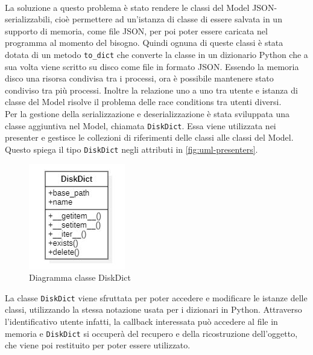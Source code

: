 \\
La soluzione a questo problema è stato rendere le classi del Model JSON-serializzabili, cioè permettere ad un'istanza di classe di essere salvata in un supporto di memoria, come file JSON, per poi poter essere caricata nel programma al momento del bisogno. Quindi ognuna di queste classi è stata dotata di un metodo \texttt{to\_dict} che converte la classe in un dizionario Python \cite{site:python-dict} che a sua volta viene scritto su disco come file in formato JSON. Essendo la memoria disco una risorsa condivisa tra i processi, ora è possibile mantenere stato condiviso tra più processi. Inoltre la relazione uno a uno tra utente e istanza di classe del Model risolve il problema delle race conditions tra utenti diversi.
\\
Per la gestione della serializzazione e deserializzazione è stata sviluppata una classe aggiuntiva nel Model, chiamata \texttt{DiskDict}. Essa viene utilizzata nei presenter e gestisce le collezioni di riferimenti delle classi alle classi del Model. Questo spiega il tipo \texttt{DiskDict} negli attributi in \autoref{fig:uml-presenters}.

\begin{figure}[H] 
    \centering 
    \includegraphics[width=0.25\columnwidth]{immagini/uml-diskdict.jpg} 
    \caption{Diagramma classe DiskDict}
    \label{fig:uml-diskdict}
\end{figure}

La classe \texttt{DiskDict} viene sfruttata per poter accedere e modificare le istanze delle classi, utilizzando la stessa notazione usata per i dizionari in Python. Attraverso l'identificativo utente infatti, la callback interessata può accedere al file in memoria e \texttt{DiskDict} si occuperà del recupero e della ricostruzione dell'oggetto, che viene poi restituito per poter essere utilizzato.


